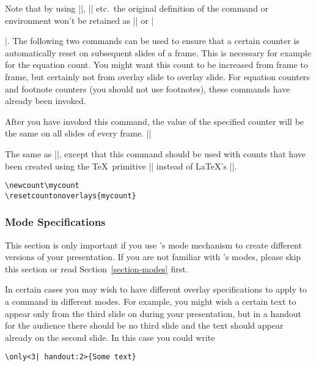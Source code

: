 Note that by using |\NewDocumentCommand|, |\NewDocumentEnvironment| etc.\  the original definition of the command or environment won't be retained as || or |\begin{original...}|.
The following two commands can be used to ensure that a certain counter is automatically reset on subsequent slides of a frame. This is necessary for example for the equation count. You might want this count to be increased from frame to frame, but certainly not from overlay slide to overlay slide. For equation counters and footnote counters (you should not use footnotes), these commands have already been invoked.

\begin{command}{\resetcounteronoverlays{}}
  After you have invoked this command, the value of the specified counter will be the same on all slides of every frame.
  \example
  ||
\end{command}

\begin{command}{\resetcountonoverlays{}}
  The same as |\resetcounteronoverlays|, except that this command should be used with counts that have been created using the \TeX\ primitive |\newcount| instead of \LaTeX's ||.
  \example
\begin{verbatim}
\newcount\mycount
\resetcountonoverlays{mycount}
\end{verbatim}
\end{command}

\subsubsection{Mode Specifications}

This section is only important if you use \beamer's mode mechanism to create different versions of your presentation. If you are not familiar with \beamer's modes, please skip this section or read Section~\ref{section-modes} first.

In certain cases you may wish to have different overlay specifications to apply to a command in different modes. For example, you might wish a certain text to appear only from the third slide on during your presentation, but in a handout for the audience there should be no third slide and the text should appear already on the second slide. In this case you could write
\begin{verbatim}
\only<3| handout:2>{Some text}
\end{verbatim}


\end{original...}
